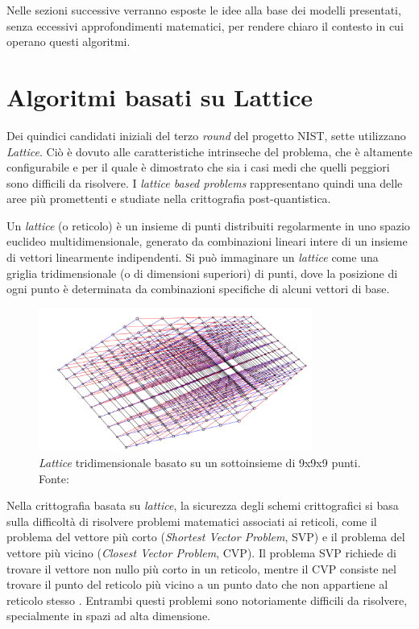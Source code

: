 Nelle sezioni successive verranno esposte le idee alla base dei modelli presentati, senza eccessivi approfondimenti matematici, per rendere chiaro il contesto in cui operano questi algoritmi.

\section{Algoritmi basati su Lattice}

Dei quindici candidati iniziali del terzo \textit{round} del progetto NIST, sette utilizzano \textit{Lattice}. Ciò è dovuto alle caratteristiche intrinseche del problema, che è altamente configurabile e per il quale è dimostrato che sia i casi medi che quelli peggiori sono difficili da risolvere. I \textit{lattice based problems} rappresentano quindi una delle aree più promettenti e studiate nella crittografia post-quantistica.

Un \textit{lattice} (o reticolo) è un insieme di punti distribuiti regolarmente in uno spazio euclideo multidimensionale, generato da combinazioni lineari intere di un insieme di vettori linearmente indipendenti. Si può immaginare un \textit{lattice} come una griglia tridimensionale (o di dimensioni superiori) di punti, dove la posizione di ogni punto è determinata da combinazioni specifiche di alcuni vettori di base.

\begin{figure}[H]
    \centering
    \includegraphics[width=0.8\textwidth]{Immagini/20240909_LBS.png}
    \caption{\textit{Lattice} tridimensionale basato su un sottoinsieme di 9x9x9 punti. Fonte: \cite{nature-pqc}}
\end{figure}

Nella crittografia basata su \textit{lattice}, la sicurezza degli schemi crittografici si basa sulla difficoltà di risolvere problemi matematici associati ai reticoli, come il problema del vettore più corto (\textit{Shortest Vector Problem}, SVP) e il problema del vettore più vicino (\textit{Closest Vector Problem}, CVP). Il problema SVP richiede di trovare il vettore non nullo più corto in un reticolo, mentre il CVP consiste nel trovare il punto del reticolo più vicino a un punto dato che non appartiene al reticolo stesso \cite{NISTthirdReport}. Entrambi questi problemi sono notoriamente difficili da risolvere, specialmente in spazi ad alta dimensione.

